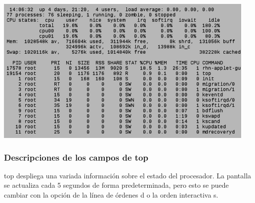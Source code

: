 \documentclass[12pt]{article}
\begin{document}
\begin{center}
 \includegraphics{top.png}
\end{center}

\subsubsection*{Descripciones de los campos de top}
       top  despliega  una variada información sobre el estado del procesador.
       La pantalla se actualiza cada 5 segundos de forma predeterminada,  pero
       esto se puede cambiar con la opción de la línea de órdenes d o la orden
       interactiva s.
\end{document}
